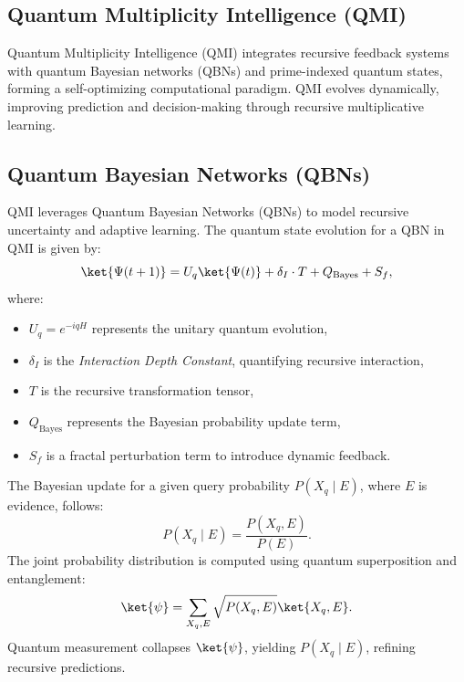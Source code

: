 \documentclass{article}
\theoremstyle{plain}
\begin{document}
\begin{itemize}
\section{Quantum Multiplicity Intelligence (QMI)}
Quantum Multiplicity Intelligence (QMI) integrates recursive feedback systems with quantum Bayesian networks (QBNs) and prime-indexed quantum states, forming a self-optimizing computational paradigm. QMI evolves dynamically, improving prediction and decision-making through recursive multiplicative learning. 

\subsection{Quantum Bayesian Networks (QBNs)}
QMI leverages Quantum Bayesian Networks (QBNs) to model recursive uncertainty and adaptive learning. The quantum state evolution for a QBN in QMI is given by:
\begin{equation}
    \ket{\Psi(t+1)} = U_q \ket{\Psi(t)} + \delta_I \cdot T + Q_{\text{Bayes}} + S_f,
\end{equation}
where:
\begin{itemize}
    \item $U_q = e^{-i q H}$ represents the unitary quantum evolution,
    \item $\delta_I$ is the \textit{Interaction Depth Constant}, quantifying recursive interaction,
    \item $T$ is the recursive transformation tensor,
    \item $Q_{\text{Bayes}}$ represents the Bayesian probability update term,
    \item $S_f$ is a fractal perturbation term to introduce dynamic feedback.
\end{itemize}

The Bayesian update for a given query probability $P(X_q \mid E)$, where $E$ is evidence, follows:
\begin{equation}
    P(X_q \mid E) = \frac{P(X_q, E)}{P(E)}.
\end{equation}
The joint probability distribution is computed using quantum superposition and entanglement:
\begin{equation}
    \ket{\psi} = \sum_{X_q, E} \sqrt{P(X_q, E)} \ket{X_q, E}.
\end{equation}
Quantum measurement collapses $\ket{\psi}$, yielding $P(X_q \mid E)$, refining recursive predictions.


\end{itemize}
\end{document}
